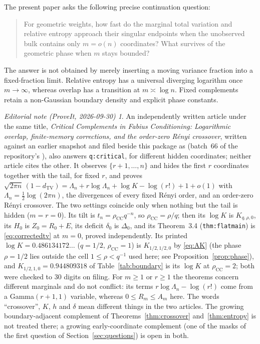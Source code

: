 \documentclass[11pt,a4paper]{article}
\numberwithin{equation}{section}
\theoremstyle{definition}
\theoremstyle{remark}
\newtheorem*{ednote}{Editorial note (ProveIt, 2026-09-30)}
\newcommand{\TV}{d_{\mathrm{TV}}}
\begin{document}
The present paper asks the following precise continuation question:
\begin{quote}
For geometric weights, how fast do the marginal total variation and
relative entropy approach their singular endpoints when the unobserved
bulk contains only $m=o(n)$ coordinates? What survives of the geometric
phase when $m$ stays bounded?
\end{quote}
The answer is not obtained by merely inserting a moving variance fraction
into a fixed-fraction limit. Relative entropy has a universal diverging
logarithm once $m\to\infty$, whereas overlap has a transition at
$m\asymp\log n$. Fixed complements retain a non-Gaussian boundary density
and explicit phase constants.
\begin{ednote}
An independently written article under the same title,
\emph{Critical Complements in Fabius Conditioning: Logarithmic overlap,
finite-memory corrections, and the order-zero R\'enyi crossover}, written
against an earlier snapshot and filed beside this package as
 (batch~66 of the
repository's ), also answers \texttt{q:critical}, for
different hidden coordinates; neither article cites the other. It
observes $\{r+1,\ldots,n\}$ and hides the first $r$ coordinates together
with the tail, for fixed $r$, and proves
$\sqrt{2\pi n}\,(1-\TV)=\Lambda_n+r\log\Lambda_n+\log K-\log(r!)+1+o(1)$
with $\Lambda_n=\frac12\log(2\pi n)$, the divergences of every fixed
R\'enyi order, and an order-zero R\'enyi crossover. The two settings
coincide only when nothing but the tail is hidden ($m=r=0$). Its tilt is
$t_n=\rho_{\mathrm{CC}}q^{-n}$, so $\rho_{\mathrm{CC}}=\rho/q$; then its
$\log K$ is $K_{q,\rho,0}$, its $H_0$ is $Z_0=R_0+E$, its deficit
$\delta_0$ is $\Delta_0$, and its Theorem~3.4 (\texttt{thm:flatmain}) is
\eqref{eq:correctedtv} at $m=0$, proved independently. Its printed
$\log K=0.486134172\ldots$ ($q=1/2$, $\rho_{\mathrm{CC}}=1$) is
$K_{1/2,1/2,0}$ by \eqref{eq:AK} (the phase $\rho=1/2$ lies outside the
cell $1\le\rho<q^{-1}$ used here; see Proposition~\ref{prop:phase}), and
$K_{1/2,1,0}=0.944809318$ of Table~\ref{tab:boundary} is its $\log K$ at
$\rho_{\mathrm{CC}}=2$; both were checked to 30 digits on filing. For
$m\ge1$ or $r\ge1$ the theorems concern different marginals and do not
conflict: its terms $r\log\Lambda_n-\log(r!)$ come from a Gamma$(r+1,1)$
variable, whereas $0\le R_m\le A_m$ here. The words ``crossover'', $K$,
$h$ and $\delta$ mean different things in the two articles. The growing
boundary-adjacent complement of Theorems~\ref{thm:crossover}
and~\ref{thm:entropy} is not treated there; a growing early-coordinate
complement (one of the masks of the first question of
Section~\ref{sec:questions}) is open in both.
\end{ednote}
\end{document}
